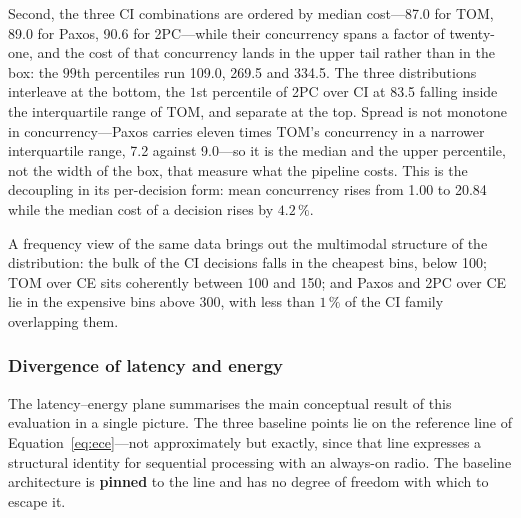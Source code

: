 \documentclass[journal]{IEEEtran}
\newcommand{\CI}{CI}                      %
\newcommand{\CE}{CE}                      %
\begin{document}
Second, the three \CI{} combinations are ordered by median cost---87.0 for
TOM, 89.0 for Paxos, 90.6 for 2PC---while their concurrency spans a factor of
twenty-one, and the cost of that concurrency lands in the upper tail rather
than in the box: the $99$th percentiles run 109.0, 269.5 and 334.5. The three
distributions interleave at the bottom, the $1$st percentile of 2PC over \CI{}
at 83.5 falling inside the interquartile range of TOM, and separate at the top.
Spread is not monotone in concurrency---Paxos carries eleven times TOM's
concurrency in a narrower interquartile range, 7.2 against 9.0---so it is the
median and the upper percentile, not the width of the box, that measure what
the pipeline costs. This is the decoupling in its per-decision form: mean
concurrency rises from 1.00 to 20.84 while the median cost of a decision rises
by $4.2\,\%$.


A frequency view of the same data brings out the multimodal structure of
the distribution: the bulk of the \CI{} decisions falls in the cheapest
bins, below 100; TOM over \CE{} sits coherently between 100 and 150; and
Paxos and 2PC over \CE{} lie in the expensive bins above 300, with less than
$1\,\%$ of the \CI{} family overlapping them.

\subsubsection{Divergence of latency and energy}


The latency--energy plane summarises the main conceptual result of this
evaluation in a single picture. The three baseline points lie on the
reference line of Equation~\eqref{eq:ece}---not approximately but
exactly, since that line expresses a structural identity for sequential
processing with an always-on radio. The baseline architecture is
\textbf{pinned} to the line and has no degree of freedom with which to
escape it.
\end{document}
